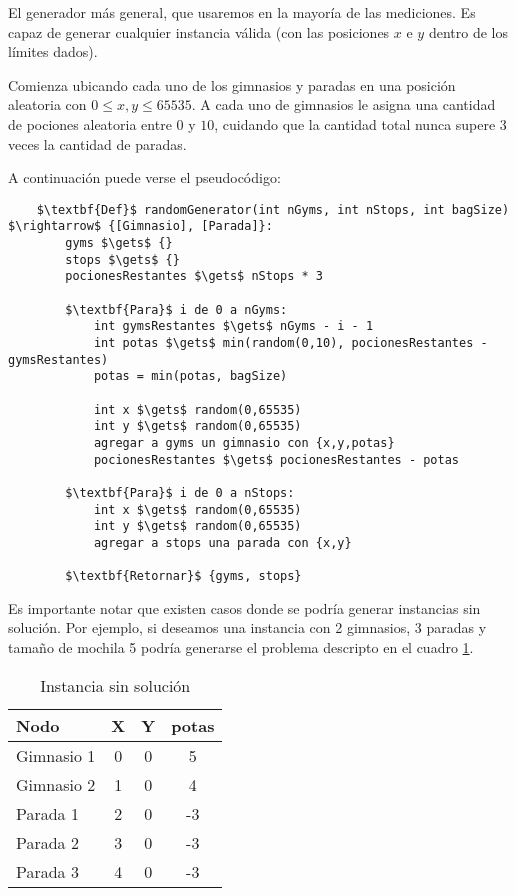 El generador más general, que usaremos en la mayoría de las mediciones.
Es capaz de generar cualquier instancia válida
(con las posiciones $x$ e $y$ dentro de los límites dados).

Comienza ubicando cada uno de los gimnasios y paradas en una posición aleatoria con $0 \leq x,y \leq 65535$.
A cada uno de gimnasios le asigna una cantidad de pociones aleatoria entre $0$ y $10$, cuidando que la cantidad total nunca supere 3 veces la cantidad de paradas.

A continuación puede verse el pseudocódigo:

\begin{lstlisting}
    $\textbf{Def}$ randomGenerator(int nGyms, int nStops, int bagSize) $\rightarrow$ {[Gimnasio], [Parada]}:
        gyms $\gets$ {}
        stops $\gets$ {}
        pocionesRestantes $\gets$ nStops * 3

        $\textbf{Para}$ i de 0 a nGyms:
            int gymsRestantes $\gets$ nGyms - i - 1
            int potas $\gets$ min(random(0,10), pocionesRestantes - gymsRestantes)
            potas = min(potas, bagSize)

            int x $\gets$ random(0,65535)
            int y $\gets$ random(0,65535)
            agregar a gyms un gimnasio con {x,y,potas}
            pocionesRestantes $\gets$ pocionesRestantes - potas

        $\textbf{Para}$ i de 0 a nStops:
            int x $\gets$ random(0,65535)
            int y $\gets$ random(0,65535)
            agregar a stops una parada con {x,y}

        $\textbf{Retornar}$ {gyms, stops}
\end{lstlisting}

Es importante notar que existen casos donde se podría generar instancias sin solución.
Por ejemplo, si deseamos una instancia con 2 gimnasios, 3 paradas y tamaño de mochila 5
podría generarse el problema descripto en el cuadro \ref{tab:generadores-random-sinsolu}.

\begin{table}[H]
    \begin{center}
        \begin{tabular}{l | c c c}
            Nodo   & X & Y & potas \\
            \hline
            Gimnasio 1 & 0 & 0 &  5 \\
            Gimnasio 2 & 1 & 0 &  4 \\
            Parada 1   & 2 & 0 & -3 \\
            Parada 2   & 3 & 0 & -3 \\
            Parada 3   & 4 & 0 & -3 \\
        \end{tabular}
        \caption{Instancia sin solución}\label{tab:generadores-random-sinsolu}
    \end{center}
\end{table}

